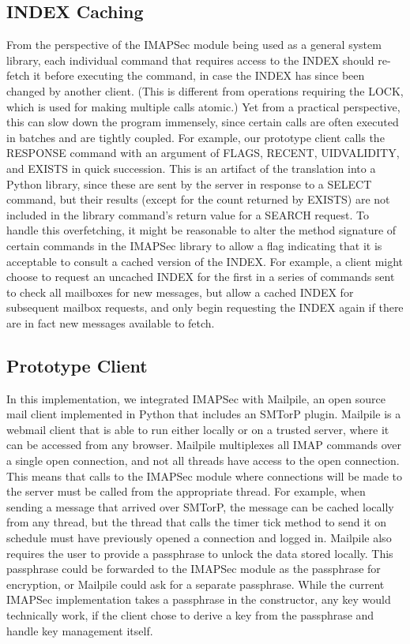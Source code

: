 \documentclass[pageno]{jpaper}
\newcommand{\project}{IMAPSec }
\begin{document}
\subsection{INDEX Caching}
From the perspective of the \project module being used as a general system library, each individual command that requires access to the INDEX should re-fetch it before executing the command, in case the INDEX has since been changed by another client. (This is different from operations requiring the LOCK, which is used for making multiple calls atomic.) Yet from a practical perspective, this can slow down the program immensely, since certain calls are often executed in batches and are tightly coupled. For example, our prototype client calls the RESPONSE command with an argument of FLAGS, RECENT, UIDVALIDITY, and EXISTS in quick succession. This is an artifact of the translation into a Python library, since these are sent by the server in response to a SELECT command, but their results (except for the count returned by EXISTS) are not included in the library command's return value for a SEARCH request. To handle this overfetching, it might be reasonable to alter the method signature of certain commands in the \project library to allow a flag indicating that it is acceptable to consult a cached version of the INDEX. For example, a client might choose to request an uncached INDEX for the first in a series of commands sent to check all mailboxes for new messages, but allow a cached INDEX for subsequent mailbox requests, and only begin requesting the INDEX again if there are in fact new messages available to fetch.

\subsection{Prototype Client}
In this implementation, we integrated \project with Mailpile, an open source mail client implemented in Python that includes an SMTorP plugin. Mailpile is a webmail client that is able to run either locally or on a trusted server, where it can be accessed from any browser. Mailpile multiplexes all IMAP commands over a single open connection, and not all threads have access to the open connection. This means that calls to the \project module where connections will be made to the server must be called from the appropriate thread. For example, when sending a message that arrived over SMTorP, the message can be cached locally from any thread, but the thread that calls the timer tick method to send it on schedule must have previously opened a connection and logged in. Mailpile also requires the user to provide a passphrase to unlock the data stored locally. This passphrase could be forwarded to the \project module as the passphrase for encryption, or Mailpile could ask for a separate passphrase. While the current \project implementation takes a passphrase in the constructor, any key would technically work, if the client chose to derive a key from the passphrase and handle key management itself.
\end{document}
